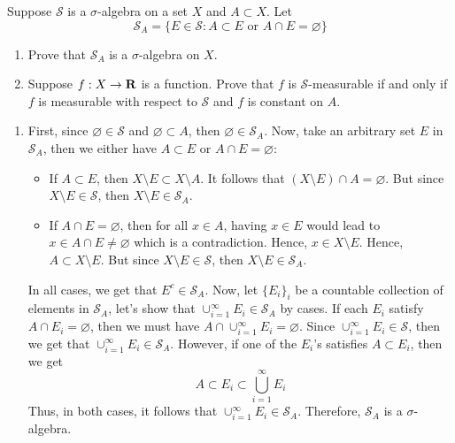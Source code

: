 \begin{exercise}
    Suppose $\mathcal{S}$ is a $\sigma$-algebra on a set $X$ and $A \subset X$. Let
    $$\mathcal{S}_A = \{E \in \mathcal{S} : A \subset E \text{ or } A\cap E = \varnothing\}$$
    \begin{enumerate}[label = (\alph*)]
        \item Prove that $\mathcal{S}_A$ is a $\sigma$-algebra on $X$.
        \item Suppose $f : X \to \mathbf{R}$ is a function. Prove that $f$ is $\mathcal{S}$-measurable if and only if $f$ is measurable with respect to $\mathcal{S}$ and $f$ is constant on $A$.\\
    \end{enumerate}
\end{exercise}

\begin{solution}
     \begin{enumerate}[label = (\alph*)]
        \item First, since $\varnothing \in \mathcal{S}$ and $\varnothing \subset A$, then $\varnothing \in \mathcal{S}_A$. Now, take an arbitrary set $E$ in $\mathcal{S}_A$, then we either have $A \subset E$ or $A \cap E = \varnothing$:
        \begin{itemize}
            \item If $A \subset E$, then $X \setminus E \subset X \setminus A$. It follows that $(X \setminus E) \cap A = \varnothing$. But since $X \setminus E \in \mathcal{S}$, then $X \setminus E \in \mathcal{S}_A$.
            \item If $A \cap E = \varnothing$, then for all $x \in A$, having $x \in E$ would lead to $x \in A \cap E \neq \varnothing$ which is a contradiction. Hence, $x \in X \setminus E$. Hence, $A \subset X \setminus E$. But since $X \setminus E \in \mathcal{S}$, then $X \setminus E \in \mathcal{S}_A$.
        \end{itemize}
        In all cases, we get that $E^c \in \mathcal{S}_A$. Now, let $\{E_i\}_i$ be a countable collection of elements in $\mathcal{S}_A$, let's show that $\cup_{i=1}^{\infty}E_i \in \mathcal{S}_A$ by cases. If each $E_i$ satisfy $A \cap E_i = \varnothing$, then we must have $A\cap\cup_{i=1}^{\infty}E_i = \varnothing$. Since $\cup_{i=1}^{\infty}E_i \in \mathcal{S}$, then we get that $\cup_{i=1}^{\infty}E_i \in \mathcal{S}_A$. However, if one of the $E_i$'s satisfies $A \subset E_i$, then we get
        $$A \subset E_i \subset \bigcup_{i=1}^{\infty}E_i$$
        Thus, in both cases, it follows that $\cup_{i=1}^{\infty}E_i \in \mathcal{S}_A$. Therefore, $\mathcal{S}_A$ is a $\sigma$-algebra.

\end{enumerate}
\end{solution}
